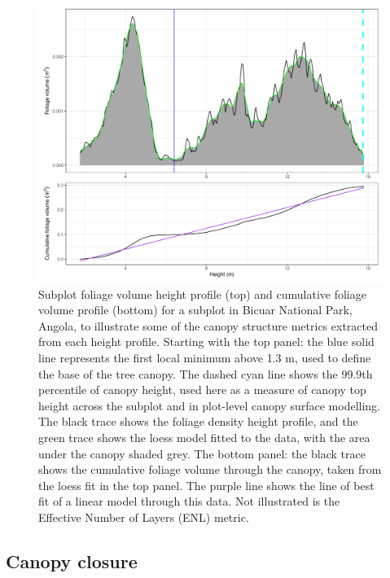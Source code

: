 \documentclass[11pt,a4paper]{article}
\begin{document}
\begin{figure}
\centering
	\includegraphics[width=\linewidth]{height_profile_illus_all}
	\caption{Subplot foliage volume height profile (top) and cumulative foliage volume profile (bottom) for a subplot in Bicuar National Park, Angola, to illustrate some of the canopy structure metrics extracted from each height profile. Starting with the top panel: the blue solid line represents the first local minimum above 1.3 m, used to define the base of the tree canopy. The dashed cyan line shows the 99.9th percentile of canopy height, used here as a measure of canopy top height across the subplot and in plot-level canopy surface modelling. The black trace shows the foliage density height profile, and the green trace shows the loess model fitted to the data, with the area under the canopy shaded grey. The bottom panel: the black trace shows the cumulative foliage volume through the canopy, taken from the loess fit in the top panel. The purple line shows the line of best fit of a linear model through this data. Not illustrated is the Effective Number of Layers (ENL) metric.}
	\label{height_profile_illus}
\end{figure}

\subsection{Canopy closure}
\end{document}
